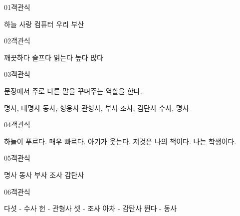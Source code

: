 \documentclass[fs9,seriesFre]{korfarm-base}
\begin{document}

\par\medskip
\kfBeginMC
\begin{kfQBlock}{01}{객관식}
\begin{kfChoices}
\kfChoice 하늘
\kfChoice 사랑
\kfChoice 컴퓨터
\kfChoice 우리
\kfChoice 부산
\end{kfChoices}
\end{kfQBlock}
\begin{kfQBlock}{02}{객관식}
\begin{kfChoices}
\kfChoice 깨끗하다
\kfChoice 슬프다
\kfChoice 읽는다
\kfChoice 높다
\kfChoice 많다
\end{kfChoices}
\end{kfQBlock}
\begin{kfQBlock}{03}{객관식}
\begin{kfEvidence}문장에서 주로 다른 말을 꾸며주는 역할을 한다.\end{kfEvidence}
\begin{kfChoices}
\kfChoice 명사, 대명사
\kfChoice 동사, 형용사
\kfChoice 관형사, 부사
\kfChoice 조사, 감탄사
\kfChoice 수사, 명사
\end{kfChoices}
\end{kfQBlock}
\begin{kfQBlock}{04}{객관식}
\begin{kfChoices}
\kfChoice 하늘이 푸르다.
\kfChoice 매우 빠르다.
\kfChoice 아기가 웃는다.
\kfChoice 저것은 나의 책이다.
\kfChoice 나는 학생이다.
\end{kfChoices}
\end{kfQBlock}
\begin{kfQBlock}{05}{객관식}
\begin{kfChoices}
\kfChoice 명사
\kfChoice 동사
\kfChoice 부사
\kfChoice 조사
\kfChoice 감탄사
\end{kfChoices}
\end{kfQBlock}
\begin{kfQBlock}{06}{객관식}
\begin{kfChoices}
\kfChoice 다섯 - 수사
\kfChoice 헌 - 관형사
\kfChoice 셋 - 조사
\kfChoice 아차 - 감탄사
\kfChoice 뛴다 - 동사
\end{kfChoices}
\end{kfQBlock}
\end{document}
